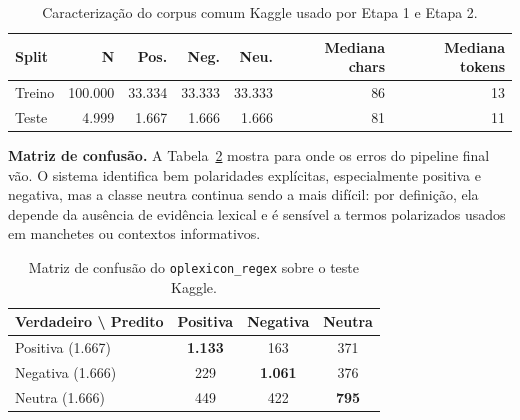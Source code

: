 \documentclass[11pt,a4paper]{article}
\begin{document}
\begin{table}[h]
\small
\centering
\begin{tabular}{@{}lrrrrrr@{}}
\toprule
\textbf{Split} & \textbf{N} & \textbf{Pos.} & \textbf{Neg.} & \textbf{Neu.} & \textbf{Mediana chars} & \textbf{Mediana tokens} \\
\midrule
Treino & 100.000 & 33.334 & 33.333 & 33.333 & 86 & 13 \\
Teste  & 4.999   & 1.667  & 1.666  & 1.666  & 81 & 11 \\
\bottomrule
\end{tabular}
\caption{Caracterização do corpus comum Kaggle usado por Etapa 1 e Etapa 2.}
\label{tab:dataset-kaggle}
\end{table}

\begin{table}[h]
\small
\centering
{}
\caption{Resultado oficial da Etapa 1 no \emph{split} de teste Kaggle. Este valor passa a ser o ponto de comparação interno para os modelos da Etapa 2.}
\label{tab:benchmark}
\end{table}

\textbf{Matriz de confusão.} A Tabela~\ref{tab:confusao} mostra para onde os erros do pipeline final vão. O sistema identifica bem polaridades explícitas, especialmente positiva e negativa, mas a classe neutra continua sendo a mais difícil: por definição, ela depende da ausência de evidência lexical e é sensível a termos polarizados usados em manchetes ou contextos informativos.

\begin{table}[h]
\small
\centering
\begin{tabular}{@{}lccc@{}}
\toprule
\textbf{Verdadeiro \textbackslash{} Predito} & \textbf{Positiva} & \textbf{Negativa} & \textbf{Neutra} \\
\midrule
Positiva (1.667) & \textbf{1.133} & 163 & 371 \\
Negativa (1.666) & 229 & \textbf{1.061} & 376 \\
Neutra (1.666)   & 449 & 422 & \textbf{795} \\
\bottomrule
\end{tabular}
\caption{Matriz de confusão do \texttt{oplexicon\_regex} sobre o teste Kaggle.}
\label{tab:confusao}
\end{table}
\end{document}
